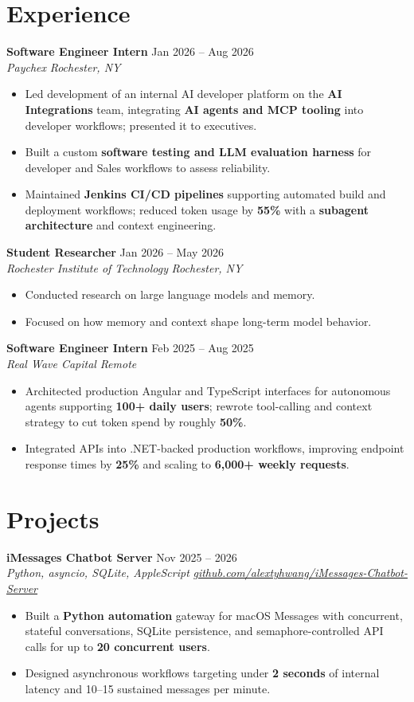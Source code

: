 \documentclass[10pt,letterpaper]{article}
\newif\ifresumeFirstRole
\newcommand{\resumeRole}[4]{%
  \ifresumeFirstRole
    \global\resumeFirstRolefalse
  \else
    \vspace{0pt plus 1fill}%
  \fi
  \textbf{#1} \hfill #2\\
  \textit{#3} \hfill \textit{#4}
}
\begin{document}
\section*{Experience}
\resumeRole{Software Engineer Intern}{Jan 2026 -- Aug 2026}{Paychex}{Rochester, NY}
\begin{itemize}
  \item Led development of an internal AI developer platform on the \textbf{AI Integrations} team, integrating \textbf{AI agents and MCP tooling} into developer workflows; presented it to executives.
  \item Built a custom \textbf{software testing and LLM evaluation harness} for developer and Sales workflows to assess reliability.
  \item Maintained \textbf{Jenkins CI/CD pipelines} supporting automated build and deployment workflows; reduced token usage by \textbf{55\%} with a \textbf{subagent architecture} and context engineering.
\end{itemize}

\resumeRole{Student Researcher}{Jan 2026 -- May 2026}{Rochester Institute of Technology}{Rochester, NY}
\begin{itemize}
  \item Conducted research on large language models and memory.
  \item Focused on how memory and context shape long-term model behavior.
\end{itemize}

\resumeRole{Software Engineer Intern}{Feb 2025 -- Aug 2025}{Real Wave Capital}{Remote}
\begin{itemize}
  \item Architected production Angular and TypeScript interfaces for autonomous agents supporting \textbf{100+ daily users}; rewrote tool-calling and context strategy to cut token spend by roughly \textbf{50\%}.
  \item Integrated APIs into .NET-backed production workflows, improving endpoint response times by \textbf{25\%} and scaling to \textbf{6,000+ weekly requests}.
\end{itemize}

\section*{Projects}
\resumeRole{iMessages Chatbot Server}{Nov 2025 -- 2026}{Python, asyncio, SQLite, AppleScript}{\href{https://github.com/alextyhwang/iMessages-Chatbot-Server}{github.com/alextyhwang/iMessages-Chatbot-Server}}
\begin{itemize}
  \item Built a \textbf{Python automation} gateway for macOS Messages with concurrent, stateful conversations, SQLite persistence, and semaphore-controlled API calls for up to \textbf{20 concurrent users}.
  \item Designed asynchronous workflows targeting under \textbf{2 seconds} of internal latency and 10--15 sustained messages per minute.
\end{itemize}
\end{document}
